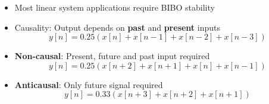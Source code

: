 \documentclass[conference]{IEEEtran}
\begin{document}
\begin{itemize}
  \item Most linear system applications require BIBO stability
  
  \item Causality: Output depends on \textbf{past} and \textbf{present} inputs
  $$
    y[n] = 0.25(x[n] + x[n - 1] + x[n - 2] + x[n - 3])
  $$

  \item \textbf{Non-causal}: Present, future and past input required
  $$
    y[n] = 0.25(x[n + 2] + x[n + 1] + x[n] + x[n - 1])
  $$

  \item \textbf{Anticausal}: Only future signal required 
  $$
    y[n] = 0.33(x[n + 3] + x[n + 2] + x[n + 1])
  $$
\end{itemize}


\end{document}
